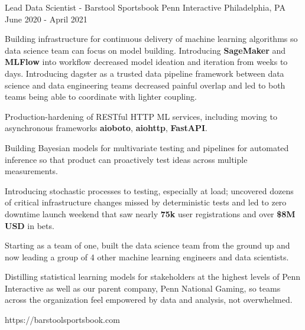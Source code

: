 \begin{cventries}
	\cventrylink
	{Lead Data Scientist - Barstool Sportsbook}
	{Penn Interactive}
	{Philadelphia, PA}
	{June 2020 - April 2021}
	{
		\begin{cvitems}
			\item{Building infrastructure for continuous delivery of machine learning algorithms so data science team can focus on model building. Introducing \textbf{SageMaker} and \textbf{MLFlow} into workflow decreased model ideation and iteration from weeks to days. Introducing dagster as a trusted data pipeline framework between data science and data engineering teams decreased painful overlap and led to both teams being able to coordinate with lighter coupling.}
			\item{Production-hardening of RESTful HTTP ML services, including moving to asynchronous frameworks \textbf{aioboto}, \textbf{aiohttp}, \textbf{FastAPI}.}
			\item{Building Bayesian models for multivariate testing and pipelines for automated inference so that product can proactively test ideas across multiple measurements.}
			\item{Introducing stochastic processes to testing, especially at load; uncovered dozens of critical infrastructure changes missed by deterministic tests and led to zero downtime launch weekend that saw nearly \textbf{75k} user registrations and over \textbf{\$8M USD} in bets.}
			\item{Starting as a team of one, built the data science team from the ground up and now leading a group of 4 other machine learning engineers and data scientists.}
			\item{Distilling statistical learning models for stakeholders at the highest levels of Penn Interactive as well as our parent company, Penn National Gaming, so teams across the organization feel empowered by data and analysis, not overwhelmed.}
		\end{cvitems}
	}
	{https://barstoolsportsbook.com}



\end{cventries}

